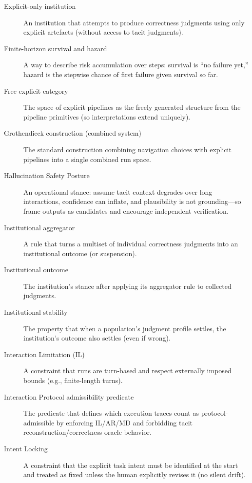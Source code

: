 \begin{description}
\item[Explicit-only institution] An institution that attempts to produce correctness judgments using only explicit artefacts (without access to tacit judgments).

\item[Finite-horizon survival and hazard] A way to describe risk accumulation over steps: survival is “no failure yet,” hazard is the stepwise chance of first failure given survival so far.

\item[Free explicit category] The space of explicit pipelines as the freely generated structure from the pipeline primitives (so interpretations extend uniquely).

\item[Grothendieck construction (combined system)] The standard construction combining navigation choices with explicit pipelines into a single combined run space.

\item[Hallucination Safety Posture] An operational stance: assume tacit context degrades over long interactions, confidence can inflate, and plausibility is not grounding—so frame outputs as candidates and encourage independent verification.

\item[Institutional aggregator] A rule that turns a multiset of individual correctness judgments into an institutional outcome (or suspension).

\item[Institutional outcome] The institution’s stance after applying its aggregator rule to collected judgments.

\item[Institutional stability] The property that when a population’s judgment profile settles, the institution’s outcome also settles (even if wrong).

\item[Interaction Limitation (IL)] A constraint that runs are turn-based and respect externally imposed bounds (e.g., finite-length turns).

\item[Interaction Protocol admissibility predicate] The predicate that defines which execution traces count as protocol-admissible by enforcing IL/AR/MD and forbidding tacit reconstruction/correctness-oracle behavior.

\item[Intent Locking] A constraint that the explicit task intent must be identified at the start and treated as fixed unless the human explicitly revises it (no silent drift).


\end{description}
